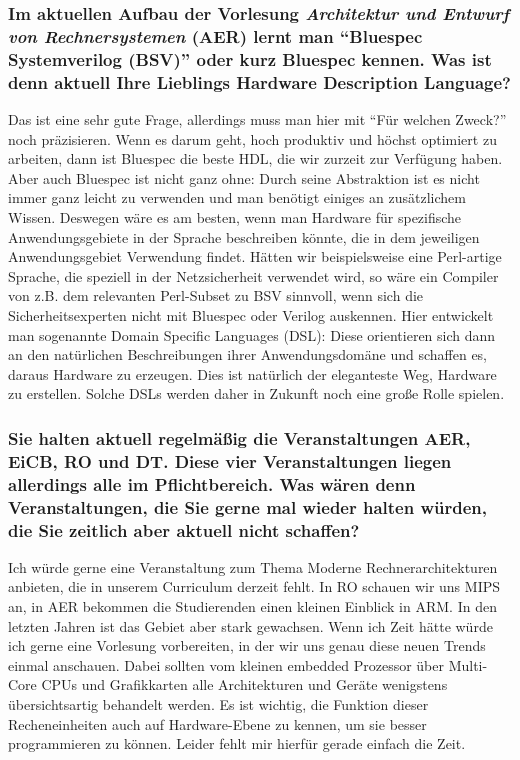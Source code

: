 {\subsubsection{Im aktuellen Aufbau der Vorlesung \textit{Architektur und Entwurf von Rechnersystemen} (AER) lernt man "`Bluespec Systemverilog (BSV)"' oder kurz Bluespec kennen. Was ist denn aktuell Ihre Lieblings Hardware Description Language?}
Das ist eine sehr gute Frage, allerdings muss man hier mit "`Für welchen Zweck?"' noch präzisieren. Wenn es darum geht, hoch produktiv und höchst optimiert zu arbeiten, dann ist Bluespec die beste HDL, die wir zurzeit zur Verfügung haben. Aber auch Bluespec ist nicht ganz ohne: Durch seine Abstraktion ist es nicht immer ganz leicht zu verwenden und man benötigt einiges an zusätzlichem Wissen. Deswegen wäre es am besten, wenn man Hardware für spezifische Anwendungsgebiete in der Sprache beschreiben könnte, die in dem jeweiligen Anwendungsgebiet Verwendung findet. Hätten wir beispielsweise eine Perl-artige Sprache, die speziell in der Netzsicherheit verwendet wird, so wäre ein Compiler von z.B. dem relevanten Perl-Subset zu BSV sinnvoll, wenn sich die Sicherheitsexperten nicht mit Bluespec oder Verilog auskennen. Hier entwickelt man sogenannte Domain Specific Languages (DSL): Diese orientieren sich dann an den natürlichen Beschreibungen ihrer Anwendungsdomäne und  schaffen es, daraus Hardware zu erzeugen. Dies ist natürlich der eleganteste Weg, Hardware zu erstellen. Solche DSLs werden daher in Zukunft noch eine große Rolle spielen.

\subsubsection{Sie halten aktuell regelmäßig die Veranstaltungen AER, EiCB, RO und DT. Diese vier Veranstaltungen liegen allerdings alle im Pflichtbereich. Was wären denn Veranstaltungen, die Sie gerne mal wieder halten würden, die Sie zeitlich aber aktuell nicht schaffen?}
Ich würde gerne eine Veranstaltung zum Thema Moderne Rechnerarchitekturen anbieten, die in unserem Curriculum derzeit fehlt. In RO schauen wir uns MIPS an, in AER bekommen die Studierenden einen kleinen Einblick in ARM. In den letzten Jahren ist das Gebiet aber stark gewachsen. Wenn ich Zeit hätte würde ich gerne eine Vorlesung vorbereiten, in der wir uns genau diese neuen Trends einmal anschauen. Dabei sollten vom kleinen embedded Prozessor über Multi-Core CPUs und Grafikkarten alle Architekturen und Geräte wenigstens übersichtsartig behandelt werden. Es ist wichtig, die Funktion dieser Recheneinheiten auch auf Hardware-Ebene zu kennen, um sie besser programmieren zu können. Leider fehlt mir hierfür gerade einfach die Zeit.

}
